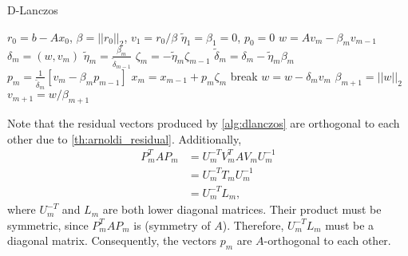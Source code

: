 \begin{algorithm}[H]
  \caption{D-Lanczos \cite[Algorithm 6.17]{iter_method_saad}}
  \begin{algorithmic}
    \State $r_0 = b - Ax_0$, $\beta = ||r_0||_2$, $v_1 = r_0 / \beta$
    \State $\tilde{\eta}_1 = \beta_1 = 0$, $p_0 = 0$
    \State $w = Av_m - \beta_m v_{m-1}$
    \State $\delta_m = (w, v_m)$
    \State $\tilde{\eta}_m = \frac{\beta_m}{\tilde{\delta}_{m-1}}$
    \State $\zeta_m = -\tilde{\eta}_m \zeta_{m-1}$
    \EndIf
    \State $\tilde{\delta}_m = \delta_m - \tilde{\eta}_m \beta_m$
    \State $p_m = \frac{1}{\tilde{\delta}_m}\left[v_m - \beta_m p_{m-1}\right]$
    \State $x_m = x_{m-1} + p_m \zeta_m$
    \State break
    \EndIf
    \State $w = w - \delta_m v_m$
    \State $\beta_{m+1} = ||w||_2$
    \State $v_{m+1} = w / \beta_{m+1}$
    \EndFor
  \end{algorithmic}
  \label{alg:dlanczos}
\end{algorithm}
Note that the residual vectors produced by \cref{alg:dlanczos} are orthogonal to each other due to \cref{th:arnoldi_residual}. Additionally,
\begin{align*}
  P^T_m A P_m & = U_m^{-T} V_m^T A V_m U_m^{-1} \\
              & = U_m^{-T} T_m U_m^{-1}         \\
              & = U_m^{-T} L_m,
\end{align*}
where $U_m^{-T}$ and $L_m$ are both lower diagonal matrices. Their product must be symmetric, since $P^T_m A P_m$ is (symmetry of $A$). Therefore, $U_m^{-T} L_m$ must be a diagonal matrix. Consequently, the vectors $p_m$ are $A$-orthogonal to each other.

